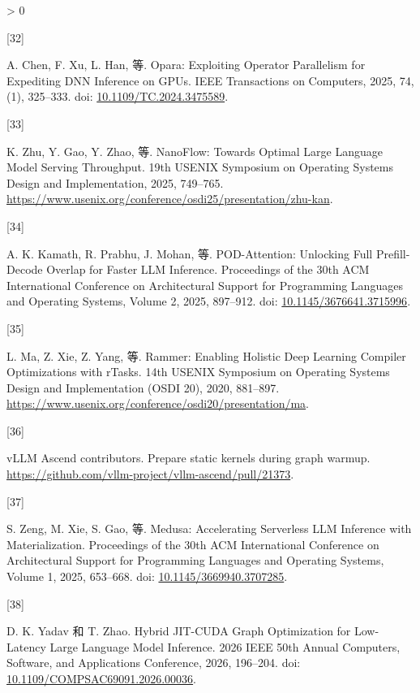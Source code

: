 \documentclass[
  UTF8,
  zihao=5]{ctexart}
\newlength{\cslhangindent}
\newlength{\csllabelwidth}
\newenvironment{CSLReferences}[2] %
 {%
  \setlength{\parindent}{0pt}
  \ifodd #1 \everypar{\setlength{\hangindent}{\cslhangindent}}\ignorespaces\fi
  \ifnum #2 > 0
  \setlength{\parskip}{#2\baselineskip}
  \fi
 }%
 {}
\newcommand{\CSLLeftMargin}[1]{\parbox[t]{\csllabelwidth}{#1}}
\newcommand{\CSLRightInline}[1]{\parbox[t]{\linewidth - \csllabelwidth}{#1}\par}
\begin{document}
\begin{CSLReferences}{0}{0}
\leavevmode{}%
\CSLLeftMargin{{[}32{]} }%
\CSLRightInline{A. Chen, F. Xu, L. Han, 等. Opara: Exploiting Operator
Parallelism for Expediting DNN Inference on GPUs. IEEE Transactions on
Computers, 2025, 74, (1), 325--333. doi:
\href{https://doi.org/10.1109/TC.2024.3475589}{10.1109/TC.2024.3475589}.}

\leavevmode{}%
\CSLLeftMargin{{[}33{]} }%
\CSLRightInline{K. Zhu, Y. Gao, Y. Zhao, 等. {NanoFlow: Towards Optimal
Large Language Model Serving Throughput}. 19th USENIX Symposium on
Operating Systems Design and Implementation, 2025, 749--765.
\url{https://www.usenix.org/conference/osdi25/presentation/zhu-kan}.}

\leavevmode{}%
\CSLLeftMargin{{[}34{]} }%
\CSLRightInline{A. K. Kamath, R. Prabhu, J. Mohan, 等. {POD-Attention:
Unlocking Full Prefill-Decode Overlap for Faster LLM Inference}.
Proceedings of the 30th ACM International Conference on Architectural
Support for Programming Languages and Operating Systems, Volume 2, 2025,
897--912. doi:
\href{https://doi.org/10.1145/3676641.3715996}{10.1145/3676641.3715996}.}

\leavevmode{}%
\CSLLeftMargin{{[}35{]} }%
\CSLRightInline{L. Ma, Z. Xie, Z. Yang, 等. Rammer: Enabling Holistic
Deep Learning Compiler Optimizations with rTasks. 14th USENIX Symposium
on Operating Systems Design and Implementation (OSDI 20), 2020,
881--897.
\url{https://www.usenix.org/conference/osdi20/presentation/ma}.}

\leavevmode{}%
\CSLLeftMargin{{[}36{]} }%
\CSLRightInline{vLLM Ascend contributors. {Prepare static kernels during
graph warmup}.
\url{https://github.com/vllm-project/vllm-ascend/pull/21373}.}

\leavevmode{}%
\CSLLeftMargin{{[}37{]} }%
\CSLRightInline{S. Zeng, M. Xie, S. Gao, 等. Medusa: Accelerating
Serverless LLM Inference with Materialization. Proceedings of the 30th
ACM International Conference on Architectural Support for Programming
Languages and Operating Systems, Volume 1, 2025, 653--668. doi:
\href{https://doi.org/10.1145/3669940.3707285}{10.1145/3669940.3707285}.}

\leavevmode{}%
\CSLLeftMargin{{[}38{]} }%
\CSLRightInline{D. K. Yadav 和 T. Zhao. {Hybrid JIT-CUDA Graph
Optimization for Low-Latency Large Language Model Inference}. 2026 IEEE
50th Annual Computers, Software, and Applications Conference, 2026,
196--204. doi:
\href{https://doi.org/10.1109/COMPSAC69091.2026.00036}{10.1109/COMPSAC69091.2026.00036}.}


\end{CSLReferences}
\end{document}
